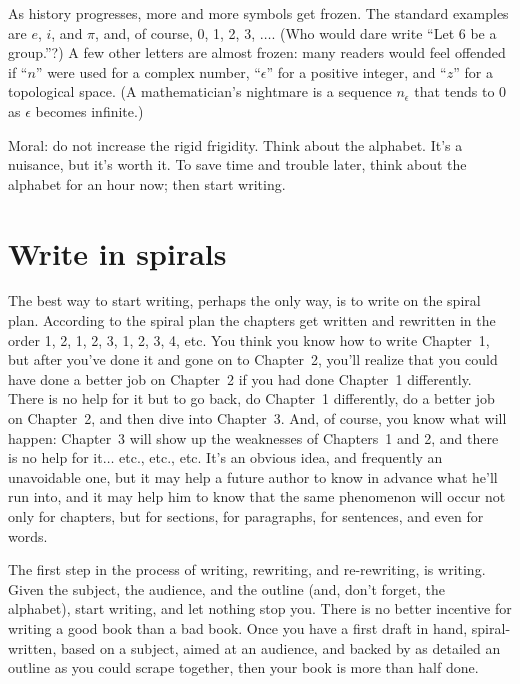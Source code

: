 \documentclass[12pt]{article}
\begin{document}
As history progresses, more and more symbols get frozen. The standard examples are $e$, $i$, and $\pi$, and, of course, 0, 1, 2, 3, $\dots$. (Who would dare write ``Let 6 be a group.''?) A few other letters are almost frozen: many readers would feel offended if ``$n$'' were used for a complex number, ``$\epsilon$'' for a positive integer, and ``$z$'' for a topological space. (A mathematician's nightmare is a sequence $n_{\epsilon}$ that tends to 0 as $\epsilon$ becomes infinite.)

Moral: do not increase the rigid frigidity. Think about the alphabet. It's a nuisance, but it's worth it. To save time and trouble later, think about the alphabet for an hour now; then start writing.

\section{Write in spirals}

The best way to start writing, perhaps the only way, is to write on the spiral plan. According to the spiral plan the chapters get written and rewritten in the order 1, 2, 1, 2, 3, 1, 2, 3, 4, etc. You think you know how to write Chapter~1, but after you've done it and gone on to Chapter~2, you'll realize that you could have done a better job on Chapter~2 if you had done Chapter~1 differently. There is no help for it but to go back, do Chapter~1 differently, do a better job on Chapter~2, and then dive into Chapter~3. And, of course, you know what will happen: Chapter~3 will show up the weaknesses of Chapters~1 and 2, and there is no help for it$\dots$ etc., etc., etc. It's an obvious idea, and frequently an unavoidable one, but it may help a future author to know in advance what he'll run into, and it may help him to know that the same phenomenon will occur not only for chapters, but for sections, for paragraphs, for sentences, and even for words.

The first step in the process of writing, rewriting, and re-rewriting, is writing. Given the subject, the audience, and the outline (and, don't forget, the alphabet), start writing, and let nothing stop you. There is no better incentive for writing a good book than a bad book. Once you have a first draft in hand, spiral-written, based on a subject, aimed at an audience, and backed by as detailed an outline as you could scrape together, then your book is more than half done. 
\end{document}
